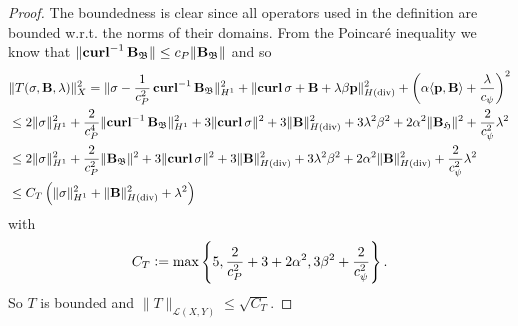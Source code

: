 \documentclass[../master_thesis.tex]{subfiles}
\begin{document}
\begin{proof}
    The boundedness is clear since all operators used in the definition 
    are bounded w.r.t. the norms of their domains. From the Poincaré inequality we know that 
    $\lVert \veccurl^{-1} \mathbf{B}_\mathfrak{B} \rVert \leq c_P \lVert \mathbf{B}_\mathfrak{B} \rVert$
    and so 
    \begin{align*}
        &\lVert T(\sigma,\mathbf{B},\lambda) \rVert^2 _X 
        = \lVert \sigma - \frac{1}{c_P^2}\veccurl^{-1}\mathbf{B}_\mathfrak{B} \rVert^2 _{H^1}
            + \lVert \veccurl \sigma + \mathbf{B} + \lambda \beta \mathbf{p} \rVert^2 _{H(\diver)}
             + \left( \alpha \langle \mathbf{p}, \mathbf{B} \rangle  + \frac{\lambda}{c_\psi} \right)^2
        \\ &\leq 2 \lVert \sigma \rVert ^2 _{H^1} 
            +  \frac{2}{c_P^4} \lVert \veccurl^{-1}\mathbf{B}_\mathfrak{B} \rVert ^2 _{H^1}
            + 3 \lVert \veccurl \sigma  \rVert^2 
            + 3 \lVert \mathbf{B} \rVert^2 _{H(\diver)}
            + 3 \lambda^2 \beta^2 + 2 \alpha^2 \lVert \mathbf{B}_\mathfrak{H}\rVert^2 
            + \frac{2}{c_\psi^2} \lambda^2
        \\ &\leq 2 \lVert \sigma \rVert ^2 _{H^1} 
            + \frac{2}{c_P^2} \lVert \mathbf{B}_\mathfrak{B} \rVert ^2 
            + 3 \lVert \veccurl \sigma  \rVert^2 
            + 3 \lVert \mathbf{B} \rVert^2 _{H(\diver)}
            + 3 \lambda^2 \beta^2 + 2 \alpha^2 \lVert \mathbf{B}\rVert^2 _{H(\diver)}
            + \frac{2}{c_\psi^2} \lambda^2
        \\ &\leq C_T \left( \lVert \sigma \rVert ^2 _{H^1} + \lVert \mathbf{B} \rVert^2 _{H(\diver)} 
            + \lambda^2 \right)
    \end{align*}
    with 
    \begin{align}
        C_T \vcentcolon= \max \left\{ 5, \frac{2}{c_P^2} + 3 + 2\alpha^2, 3 \beta^2 + \frac{2}{c_\psi^2} \right\}.
        \label{eq:bound_on_norm_of_T}
    \end{align}
    So $T$ is bounded and $\lVert T \rVert _{\mathcal{L}(X,Y)} \leq \sqrt{C_T}.$


\end{proof}
\end{document}
